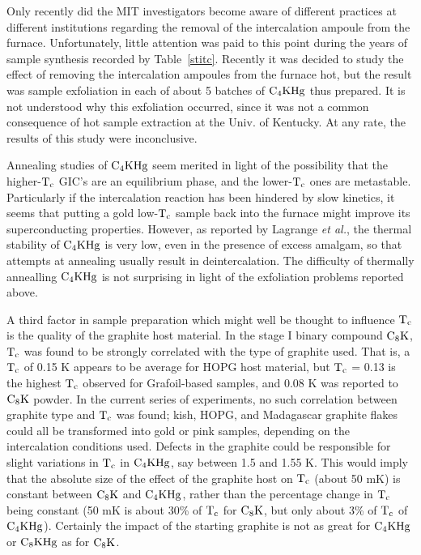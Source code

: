          Only recently did the MIT investigators  become aware of different
practices  at  different  institutions    regarding the removal     of  the
intercalation ampoule  from the  furnace.  Unfortunately, little  attention
was paid to this  point during the years  of  sample  synthesis recorded by
Table~\ref{stitc}.  Recently it was decided to study the effect of removing
the intercalation ampoules from the furnace hot,  but the result was sample
exfoliation in each of about 5 batches of $\rm C_4KHg$ thus  prepared.   It
is not understood why this exfoliation occurred, since it was  not a common
consequence of hot sample extraction at the Univ. of Kentucky.\cite{doll86}
At any rate, the results of this study were inconclusive.

        Annealing studies of $\rm  C_4KHg$  seem merited in  light  of  the
possibility that the higher-$\rm T_c$ GIC's  are an equilibrium  phase, and
the lower-$\rm T_c$ ones are metastable.  Particularly if the intercalation
reaction has  been hindered by slow kinetics,  it seems that putting a gold
low-$\rm  T_c$  sample   back   into   the    furnace   might  improve  its
superconducting  properties.  However, as    reported  by Lagrange  {\em et
al.\/}, the  thermal stability of $\rm  C_4KHg$  is very  low, even  in the
presence of excess amalgam, so that attempts at annealing usually result in
deintercalation.\cite{lagrange80a} The  difficulty of  thermally annealling
$\rm  C_4KHg$   is not surprising   in light  of   the exfoliation problems
reported above.

        A third factor in sample preparation which might well be thought to
influence $\rm T_c$ is the  quality of the  graphite host material.  In the
stage I  binary compound $\rm C_8K$,  $\rm  T_c$ was   found to be strongly
correlated with the type of graphite used.  That is, a $\rm  T_c$ of 0.15 K
appears       to      be        average           for        HOPG      host
material,\cite{koike80,kobayashi81,kaneiwa82} but  $\rm  T_c$ = 0.13 is the
highest     $\rm      T_c$           observed        for      Grafoil-based
samples,\cite{kobayashi79,kobayashi81a,sano80}  and  0.08 K was reported to
$\rm C_8K$ powder.\cite{koike80} In  the current  series of experiments, no
such correlation between graphite type and $\rm T_c$ was found; kish, HOPG,
and Madagascar graphite flakes could  all be transformed into gold  or pink
samples, depending  on the intercalation  conditions  used.  Defects in the
graphite could  be responsible for slight variations  in  $\rm T_c$ in $\rm
C_4KHg$, say between 1.5  and 1.55 K.  This would  imply that the  absolute
size  of the effect  of the graphite host  on $\rm  T_c$ (about  50  mK) is
constant between $\rm C_8K$  and $\rm C_4KHg$, rather  than  the percentage
change in $\rm T_c$ being constant (50  mK is  about 30\%  of $\rm T_c$ for
$\rm C_8K$, but only  about 3\% of $\rm  T_c$ of $\rm  C_4KHg$).  Certainly
the impact of the starting  graphite is not as  great for $\rm  C_4KHg$  or
$\rm C_8KHg$  as for $\rm C_8K$.

